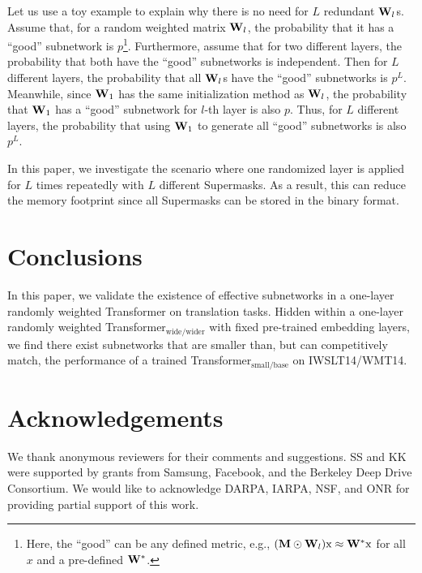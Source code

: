 Let us use a toy example to explain why there is no need for $L$ redundant ${\mathbf{W}}_l$s. 
Assume that, for a random weighted matrix ${\mathbf{W}}_l$, the probability that it has a ``good'' subnetwork is $p$\footnote{Here, the ``good'' can be any defined metric, e.g., $({\mathbf{M}}\odot{\mathbf{W}}_l)\text{x}\approx{\mathbf{W}}^*\text{x}$ for all $x$ and a pre-defined ${\mathbf{W}}^*$.}. 
Furthermore, assume that for two different layers, the probability that both have the ``good'' subnetworks is independent.
Then for $L$ different layers, the probability that all ${\mathbf{W}}_l$s have the ``good'' subnetworks is $p^L$. 
Meanwhile, since ${\mathbf{W}}_1$ has the same initialization method as ${\mathbf{W}}_l$, the probability that ${\mathbf{W}}_1$ has a ``good'' subnetwork for $l$-th layer is also $p$.
Thus, for $L$ different layers, the probability that using ${\mathbf{W}}_1$ to generate all ``good'' subnetworks is also $p^L$. 

In this paper, we investigate the scenario where one randomized layer is applied for $L$ times repeatedly with $L$ different Supermasks. 
As a result, this can reduce the memory footprint since all Supermasks can be stored in the binary format. 


\section{Conclusions}
\label{sec:conclusions}
In this paper, we validate the existence of effective subnetworks in a one-layer randomly weighted Transformer on translation tasks. 
Hidden within a one-layer randomly weighted Transformer$_\text{wide/wider}$ with fixed pre-trained embedding layers, we find there exist subnetworks that are smaller than, but can competitively match, the performance of a trained Transformer$_\text{small/base}$ on IWSLT14/WMT14. 



\section*{Acknowledgements}
We thank anonymous reviewers for their comments and suggestions. SS and KK were supported by grants from Samsung, Facebook, and the Berkeley Deep Drive Consortium. We would like to acknowledge DARPA, IARPA, NSF, and ONR for providing partial support of this work.
\vspace{-2mm}
